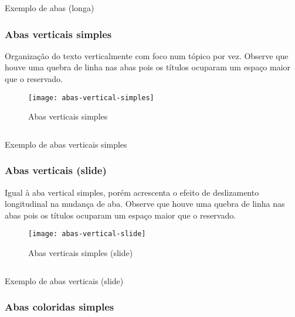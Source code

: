 \begin{code}
    \inputminted[label=abas-longa.html]{html}{../RS0001/anexos/abas-longa.html}
    \caption{Exemplo de abas (longa)}\label{RS0001:code:exemplo-abas-longa}
\end{code}


\subsubsection{Abas verticais simples}

Organização do texto verticalmente com foco num tópico por vez. Observe que houve uma quebra de linha nas abas pois os títulos ocuparam um espaço maior que o reservado.

\begin{figure}[!ht]
    \centering
    \texttt{[image: abas-vertical-simples]}
    \caption{Abas verticais simples}\label{RS0001:fig:abas-vertical-simples}
\end{figure}

\begin{code}
    \inputminted[label=abas-vertical-simples.html]{html}{../RS0001/anexos/abas-vertical-simples.html}
    \caption{Exemplo de abas verticais simples}\label{RS0001:code:exemplo-abas-vertical-simples}
\end{code}


\subsubsection{Abas verticais (slide)}

Igual à aba vertical simples, porém acrescenta o efeito de deslizamento longitudinal na mudança de aba. Observe que houve uma quebra de linha nas abas pois os títulos ocuparam um espaço maior que o reservado.

\begin{figure}[!ht]
    \centering
    \texttt{[image: abas-vertical-slide]}
    \caption{Abas verticais simples (slide)}\label{RS0001:fig:abas-vertical-slide}
\end{figure}

\begin{code}
    \inputminted[label=abas-vertical-slide.html]{html}{../RS0001/anexos/abas-vertical-slide.html}
    \caption{Exemplo de abas verticais (slide)}\label{RS0001:code:exemplo-abas-vertical-slide}
\end{code}


\subsubsection{Abas coloridas simples}

